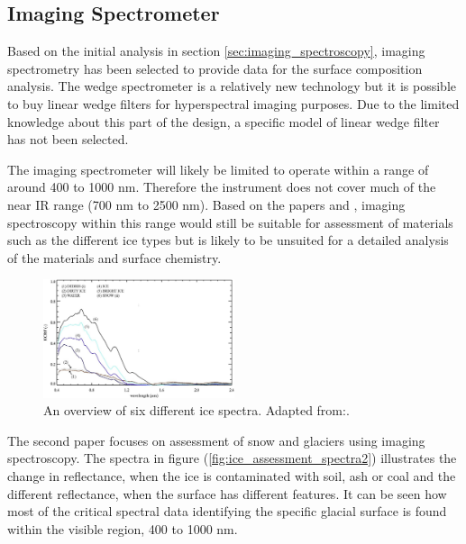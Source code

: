 \subsection{Imaging Spectrometer}
Based on the initial analysis in section \ref{sec:imaging_spectroscopy}, imaging spectrometry has been selected to provide data for the surface composition analysis. The wedge spectrometer is a relatively new technology but it is possible to buy linear wedge filters for hyperspectral imaging purposes. Due to the limited knowledge about this part of the design, a specific model of linear wedge filter has not been selected.

The imaging spectrometer will likely be limited to operate within a range of around 400 to 1000 nm. Therefore the instrument does not cover much of the near IR range (700 nm to 2500 nm). Based on the papers \cite{naegeli2015a} and \cite{negi2015a}, imaging spectroscopy within this range would still be suitable for assessment of materials such as the different ice types but is likely to be unsuited for a detailed analysis of the materials and surface chemistry.

\begin{figure}[htb!]
\centering
\includegraphics[width=0.50\textwidth]{figures/Orbiter/ice_surface_assessment_spectra}
\caption{An overview of six different ice spectra. Adapted from:\cite{naegeli2015a}.}
\label{fig:ice_assessment_spectra}
\end{figure}

The second paper focuses on assessment of snow and glaciers using imaging spectroscopy\cite{negi2015a}. The spectra in figure (\ref{fig:ice_assessment_spectra2}) illustrates the change in reflectance, when the ice is contaminated with soil, ash or coal and the different reflectance, when the surface has different features. It can be seen how most of the critical spectral data identifying the specific glacial surface is found within the visible region, 400 to 1000 nm.

